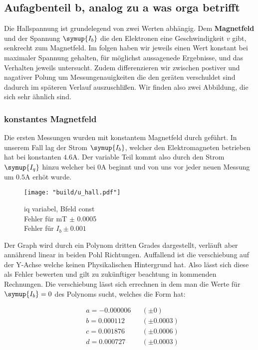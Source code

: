 \subsection{Aufagbenteil b, analog zu a was orga betrifft}
\label{sec:aufgabe_b}

Die Hallspannung ist grundelegend von zwei Werten abhängig. Dem \textbf{Magnetfeld} und der Spannung  $\symup{I_b}$ die den Elektronen eine Geschwindigkeit $v$ gibt, senkrecht zum Magnetfeld. %
Im folgen haben wir jeweils einen Wert konstant bei maximaler Spannung gehalten, für möglichst aussagenede Ergebnisse, und das Verhalten jeweils untersucht. 
Zudem differenzieren wir zwischen postiver und nagativer Polung um Messungenauigkeiten die den geräten verschuldet sind dadurch im späteren Verlauf auszuschlißen. %
Wir finden also zwei Abbildung, die sich sehr ähnlich sind.

\subsubsection{konstantes Magnetfeld}
\label{sec:Auswertung_bconst}
Die ersten Messungen wurden mit konstantem Magnetfeld durch geführt. In unserem Fall lag der Strom $\symup{I_b}$, welcher den Elektromagneten betrieben hat bei konstanten $4.6\si{\ampere}$.
Der variable Teil kommt also durch den Strom $\symup{I_q}$ hinzu welcher bei $0\si{\ampere}$ beginnt und von uns vor jeder neuen Messung um $0.5\si{\ampere}$ erhöt wurde.
\begin{figure}[h]
   \centering
    \texttt{[image: "build/u\_hall.pdf"]}
    \caption{iq variabel, Bfeld const\\Fehler für mT $\pm$ 0.0005\\Fehler für $I_b \pm 0.001$}
    \label{fig:Uhall}
\end{figure}

Der Graph wird durch ein Polynom dritten Grades dargestellt, verläuft aber annährend linear in beiden Pohl Richtungen. Auffallend ist die verschiebung auf der Y-Achse %
welche keinen Physikalischen Hintergrund hat. Also lässt sich diese als Fehler bewerten und gilt zu zukünftiger beachtung in kommenden Rechnungen.
Die verschiebung lässt sich errechnen in dem man die Werte für $\symup{I_b}=0$ des Polynoms sucht, welches die Form hat:

\begin{align*}
   &a = -0.000006 &&(\pm 0) \\
   &b = 0.000112 &&(\pm 0.0003)\\
   &c = 0.001876 &&(\pm 0.0006) \\
   &d = 0.000727 &&(\pm 0.0003) 
\end{align*}

